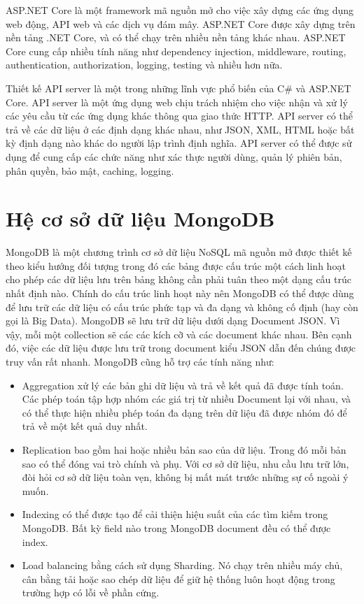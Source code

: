 \documentclass[../DoAn.tex]{subfiles}
\begin{document}
ASP.NET Core là một framework mã nguồn mở cho việc xây dựng các ứng dụng web động, API web và các dịch vụ đám mây. ASP.NET Core được xây dựng trên nền tảng .NET Core, và có thể chạy trên nhiều nền tảng khác nhau. ASP.NET Core cung cấp nhiều tính năng như dependency injection, middleware, routing, authentication, authorization, logging, testing và nhiều hơn nữa.

Thiết kế API server là một trong những lĩnh vực phổ biến của C\# và ASP.NET Core. API server là một ứng dụng web chịu trách nhiệm cho việc nhận và xử lý các yêu cầu từ các ứng dụng khác thông qua giao thức HTTP. API server có thể trả về các dữ liệu ở các định dạng khác nhau, như JSON, XML, HTML hoặc bất kỳ định dạng nào khác do người lập trình định nghĩa. API server có thể được sử dụng để cung cấp các chức năng như xác thực người dùng, quản lý phiên bản, phân quyền, bảo mật, caching, logging.
\vfill
\break


\section{Hệ cơ sở dữ liệu MongoDB}
\label{section:3.2}
MongoDB là một chương trình cơ sở dữ liệu NoSQL mã nguồn mở được thiết kế theo kiểu hướng đối tượng trong đó các bảng được cấu trúc một cách linh hoạt cho phép các dữ liệu lưu trên bảng không cần phải tuân theo một dạng cấu trúc nhất định nào. Chính do cấu trúc linh hoạt này nên MongoDB có thể được dùng để lưu trữ các dữ liệu có cấu trúc phức tạp và đa dạng và không cố định (hay còn gọi là Big Data).
\break
MongoDB sẽ lưu trữ dữ liệu dưới dạng Document JSON. Vì vậy, mỗi một collection sẽ các các kích cỡ và các document khác nhau. Bên cạnh đó, việc các dữ liệu được lưu trữ trong document kiểu JSON dẫn đến chúng được truy vấn rất nhanh. MongoDB cũng hỗ trợ các tính năng như:
\begin{itemize}
    \item Aggregation xử lý các bản ghi dữ liệu và trả về kết quả đã được tính toán. Các phép toán tập hợp nhóm các giá trị từ nhiều Document lại với nhau, và có thể thực hiện nhiều phép toán đa dạng trên dữ liệu đã được nhóm đó để trả về một kết quả duy nhất.
    \item Replication bao gồm hai hoặc nhiều bản sao của dữ liệu. Trong đó mỗi bản sao có thể đóng vai trò chính và phụ. Với cơ sở dữ liệu, nhu cầu lưu trữ lớn, đòi hỏi cơ sở dữ liệu toàn vẹn, không bị mất mát trước những sự cố ngoài ý muốn.
    \item Indexing có thể được tạo để cải thiện hiệu suất của các tìm kiếm trong MongoDB. Bất kỳ field nào trong MongoDB document đều có thể được index.
    \item Load balancing bằng cách sử dụng Sharding. Nó chạy trên nhiều máy chủ, cân bằng tải hoặc sao chép dữ liệu để giữ hệ thống luôn hoạt động trong trường hợp có lỗi về phần cứng.
\end{itemize}
\end{document}

